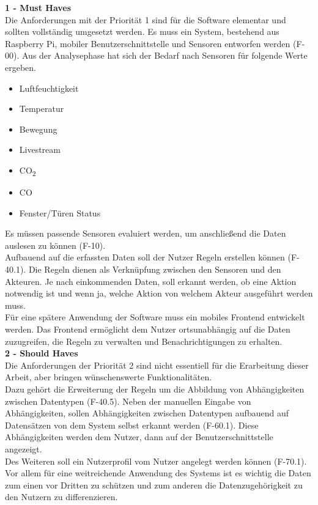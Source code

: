 \textbf{1 - Must Haves}\\
Die Anforderungen mit der Priorität 1 sind für die Software elementar und sollten vollständig umgesetzt werden. 
Es muss ein System, bestehend aus Raspberry Pi, mobiler Benutzerschnittstelle und Sensoren entworfen werden (F-00). Aus der Analysephase hat sich der Bedarf nach Sensoren für folgende Werte ergeben.
\begin{itemize}
	\item Luftfeuchtigkeit
	\item Temperatur
	\item Bewegung
	\item Livestream
	\item CO\textsubscript{2}
	\item CO
	\item Fenster/Türen Status
\end{itemize}
Es müssen passende Sensoren evaluiert werden, um anschließend die Daten auslesen zu können (F-10).\\
Aufbauend auf die erfassten Daten soll der Nutzer Regeln erstellen können (F-40.1). Die Regeln dienen als Verknüpfung zwischen den Sensoren und den Akteuren. Je nach einkommenden Daten, soll erkannt werden, ob eine Aktion notwendig ist und wenn ja, welche Aktion von welchem Akteur ausgeführt werden muss.\\
Für eine spätere Anwendung der Software muss ein mobiles Frontend entwickelt werden. Das Frontend ermöglicht dem Nutzer ortsunabhängig auf die Daten zuzugreifen, die Regeln zu verwalten und Benachrichtigungen zu erhalten.\\
\textbf{2 - Should Haves}\\
Die Anforderungen der Priorität 2 sind nicht essentiell für die Erarbeitung dieser Arbeit, aber bringen wünschenswerte Funktionalitäten.\\
Dazu gehört die Erweiterung der Regeln um die Abbildung von Abhängigkeiten zwischen Datentypen (F-40.5). Neben der manuellen Eingabe von Abhängigkeiten, sollen Abhängigkeiten zwischen Datentypen aufbauend auf Datensätzen von dem System selbst erkannt werden (F-60.1). Diese Abhängigkeiten werden dem Nutzer, dann auf der Benutzerschnittstelle angezeigt.\\
Des Weiteren soll ein Nutzerprofil vom Nutzer angelegt werden können (F-70.1). Vor allem für eine weitreichende Anwendung des Systems ist es wichtig die Daten zum einen vor Dritten zu schützen und zum anderen die Datenzugehörigkeit zu den Nutzern zu differenzieren.\\

